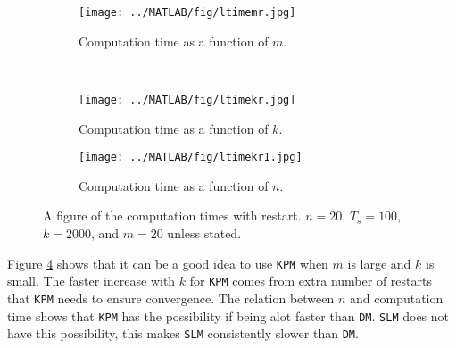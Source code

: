 \begin{figure}[H]
        \centering
        \begin{subfigure}[b]{0.45\textwidth}
                \texttt{[image: ../MATLAB/fig/ltimemr.jpg]}
                \caption{ Computation time as a function of $m$. }
                \label{fig:ltimemr}
        \end{subfigure}
        ~
        \begin{subfigure}[b]{0.45\textwidth}
                \texttt{[image: ../MATLAB/fig/ltimekr.jpg]}
                \caption{ Computation time as a function of $k$. }
                \label{fig:ltimekr}
        \end{subfigure}
        
        \begin{subfigure}[b]{0.45\textwidth}
                \texttt{[image: ../MATLAB/fig/ltimekr1.jpg]}
                \caption{ Computation time as a function of $n$. }
                \label{fig:ltimekr1}
        \end{subfigure}
        \caption{ A figure of the computation times with restart. $n = 20$, $T_s = 100$, $k = 2000$, and $m = 20$ unless stated. }
        \label{fig:ltime1}
\end{figure}
Figure \ref{fig:ltime1} shows that it can be a good idea to use \texttt{KPM} when $m$ is large and $k$ is small. The faster increase with $k$ for \texttt{KPM} comes from extra number of restarts that \texttt{KPM} needs to ensure convergence. The relation between $n$ and computation time shows that \texttt{KPM} has the possibility if being alot \cite{alot} faster than \texttt{DM}. \texttt{SLM} does not have this possibility, this makes \texttt{SLM} consistently slower than \texttt{DM}. \\
